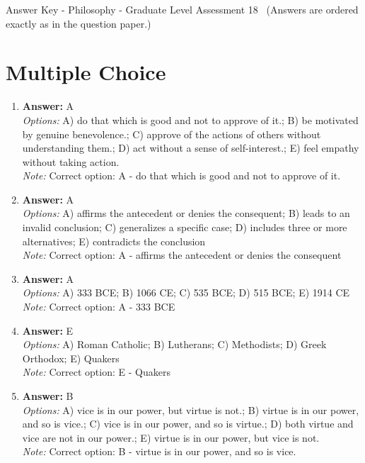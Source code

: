 \documentclass[12pt]{article}
\begin{document}
\begin{center}
Answer Key - Philosophy - Graduate Level Assessment 18 \
\small (Answers are ordered exactly as in the question paper.)
\end{center}

\section*{Multiple Choice}
\begin{enumerate}[label=\arabic*.]
\item \textbf{Answer:} A
\\ \textit{Options:} A) do that which is good and not to approve of it.; B) be motivated by genuine benevolence.; C) approve of the actions of others without understanding them.; D) act without a sense of self-interest.; E) feel empathy without taking action.
\\ \textit{Note:} Correct option: A - do that which is good and not to approve of it.
\item \textbf{Answer:} A
\\ \textit{Options:} A) affirms the antecedent or denies the consequent; B) leads to an invalid conclusion; C) generalizes a specific case; D) includes three or more alternatives; E) contradicts the conclusion
\\ \textit{Note:} Correct option: A - affirms the antecedent or denies the consequent
\item \textbf{Answer:} A
\\ \textit{Options:} A) 333 BCE; B) 1066 CE; C) 535 BCE; D) 515 BCE; E) 1914 CE
\\ \textit{Note:} Correct option: A - 333 BCE
\item \textbf{Answer:} E
\\ \textit{Options:} A) Roman Catholic; B) Lutherans; C) Methodists; D) Greek Orthodox; E) Quakers
\\ \textit{Note:} Correct option: E - Quakers
\item \textbf{Answer:} B
\\ \textit{Options:} A) vice is in our power, but virtue is not.; B) virtue is in our power, and so is vice.; C) vice is in our power, and so is virtue.; D) both virtue and vice are not in our power.; E) virtue is in our power, but vice is not.
\\ \textit{Note:} Correct option: B - virtue is in our power, and so is vice.
\end{enumerate}
\end{document}
